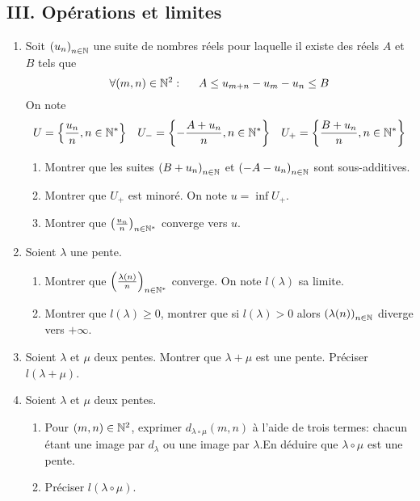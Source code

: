\subsection*{III. Opérations et limites}
\begin{enumerate}
 \item Soit $\left( u_n\right) _{n\in \mathbb{N}}$ une suite de nombres réels pour laquelle il existe des réels $A$ et $B$ tels que
\begin{displaymath}
 \forall (m,n)\in \mathbb{N}^2: \hspace{0.5cm} A\leq u_{m+n} - u_m -u_n \leq B
\end{displaymath}
On note
\begin{align*}
 U=\left\lbrace \frac{u_n}{n}, n\in \mathbb{N}^*\right\rbrace & &
 U_- = \left\lbrace -\frac{A + u_n}{n}, n\in \mathbb{N}^*\right\rbrace & &
 U_+ = \left\lbrace \frac{B + u_n}{n}, n\in \mathbb{N}^*\right\rbrace 
\end{align*}
\begin{enumerate}
 \item Montrer que les suites $\left( B + u_n\right)_{n\in \mathbb{N}}$ et $\left( -A - u_n\right)_{n\in \mathbb{N}}$ sont sous-additives.
 \item Montrer que $U_+$ est minoré. On note $u=\inf U_+$.
 \item Montrer que $\left( \frac{u_n}{n}\right) _{n\in \mathbb{N}^*}$ converge vers $u$.
\end{enumerate}
\item Soient $\lambda$ une pente.
\begin{enumerate}
 \item Montrer que $\left( \frac{\lambda(n)}{n}\right)_{n\in \mathbb{N}^*}$ converge. On note $l(\lambda)$ sa limite. 
 \item Montrer que $l(\lambda)\geq 0$, montrer que si $l(\lambda) >0$ alors $\left( \lambda(n)\right) _{n\in \mathbb{N}}$ diverge vers $+\infty$.
\end{enumerate}
 
\item Soient $\lambda$ et $\mu$ deux pentes. Montrer que $\lambda + \mu$ est une pente. Préciser $l(\lambda + \mu)$.
\item Soient $\lambda$ et $\mu$ deux pentes.
\begin{enumerate}
 \item Pour $(m,n)\in\mathbb{N}^2$, exprimer $d_{\lambda \circ \mu}(m,n)$ à l'aide de trois termes: chacun étant une image par $d_\lambda$ ou une image par $\lambda$.\newline En déduire que $\lambda \circ \mu$ est une pente.
 \item Préciser $l(\lambda \circ \mu)$.
\end{enumerate}
\end{enumerate}
